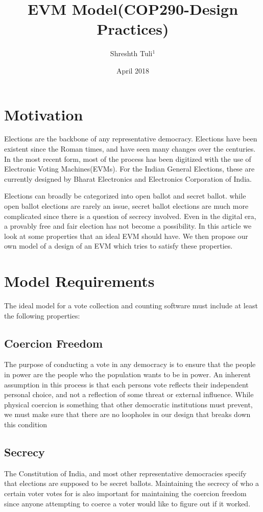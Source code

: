 \documentclass{article}
\title{EVM Model(COP290-Design Practices)}
\author{Shreshth Tuli$^{1}$}
\date{April 2018}
\begin{document}
\maketitle
{}
\section{Motivation}
Elections are the backbone of any representative democracy. Elections have been existent since the Roman times, and have seen many changes over the centuries. In the most recent form, most of the process has been digitized with the use of Electronic Voting Machines(EVMs). For the Indian General Elections, these are currently designed by Bharat Electronics and Electronics Corporation of India.

Elections can broadly be categorized into open ballot and secret ballot. while open ballot elections are rarely an issue, secret ballot elections are much more complicated since there is a question of secrecy involved. Even in the digital era, a provably free and fair election has not become a possibility. In this article we look at some properties that an ideal EVM should have. We then propose our own model of a design of an EVM which tries to satisfy these properties.
\section{Model Requirements}
The ideal model for a vote collection and counting software must include at least the following properties:
\subsection{Coercion Freedom}
The purpose of conducting a vote in any democracy is to ensure that the people in power are the people who the population wants to be in power. An inherent assumption in this process is that each persons vote reflects their independent personal choice, and not a reflection of some threat or external influence. While physical coercion is something that other democratic institutions must prevent, we must make sure that there are no loopholes in our design that breaks down this condition
\subsection{Secrecy}
The Constitution of India, and most other representative democracies specify that elections are supposed to be secret ballots. Maintaining the secrecy of who  a certain voter votes for is also important for maintaining the coercion freedom since anyone attempting to coerce a voter would like to figure out if it worked.\newline
\end{document}
